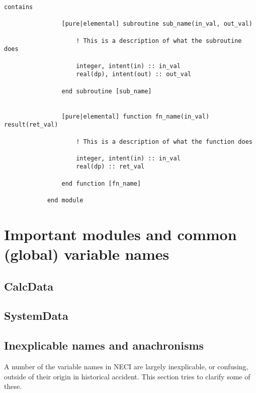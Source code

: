 \documentclass[a4paper,notitlepage]{scrreprt}
\begin{document}
\begin{description}
\begin{lstlisting}[gobble=12]
            contains

            	[pure|elemental] subroutine sub_name(in_val, out_val)

            		! This is a description of what the subroutine does

            		integer, intent(in) :: in_val
            		real(dp), intent(out) :: out_val

            	end subroutine [sub_name]


            	[pure|elemental] function fn_name(in_val) result(ret_val)

            		! This is a description of what the function does

            		integer, intent(in) :: in_val
            		real(dp) :: ret_val

            	end function [fn_name]

            end module
		\end{lstlisting}

\end{description}

\section{Important modules and common (global) variable names}
\label{sect:cons-types}

\subsection{\ttfamily CalcData}
\subsection{\ttfamily SystemData}

\subsection{Inexplicable names and anachronisms}
	A number of the variable names in NECI are largely inexplicable, or
	confusing, outside of their origin in historical accident. This section
	tries to clarify some of these.
\end{document}
